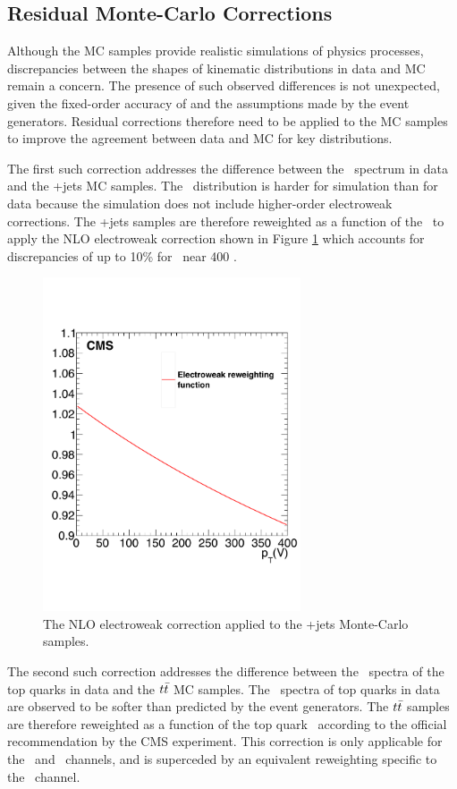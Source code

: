 \subsection{Residual Monte-Carlo Corrections}

Although the MC samples provide realistic simulations of physics processes, discrepancies between the shapes of kinematic distributions in data and MC remain a concern. The presence of such observed differences is not unexpected, given the fixed-order accuracy of and the assumptions made by the event generators. Residual corrections therefore need to be applied to the MC samples to improve the agreement between data and MC for key distributions.

The first such correction addresses the difference between the \pTV\ spectrum in data and the \bosV+jets MC samples. The \pTV\ distribution is harder for simulation than for data because the simulation does not include higher-order electroweak corrections.\cite{EWKCORR} The \bosV+jets samples are therefore reweighted as a function of the \pTV\ to apply the NLO electroweak correction shown in Figure \ref{fig:vjetsewkweight} which accounts for discrepancies of up to 10\% for \pTV\ near 400 \GeV.

\begin{figure}[htbp]
  \centering
    \includegraphics[width=3in]{images/ewk_vjets_correction}
    \caption[2017 \bosV+jets MC Electroweak Correction]{The NLO electroweak correction applied to the \bosV+jets Monte-Carlo samples.}
    \label{fig:vjetsewkweight}
\end{figure}

The second such correction addresses the difference between the \pT\ spectra of the top quarks in data and the $t\bar{t}$ MC samples. The \pT\ spectra of top quarks in data are observed to be softer than predicted by the event generators. The $t\bar{t}$ samples are therefore reweighted as a function of the top quark \pT\ according to the official recommendation by the CMS experiment.\cite{CMSTTCORR} This correction is only applicable for the \ZnnH\ and \ZllH\ channels, and is superceded by an equivalent reweighting specific to the \WlnH\ channel.

